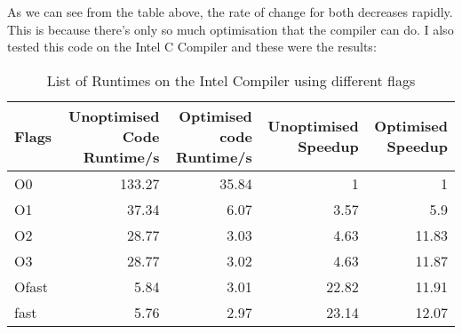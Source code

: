 \documentclass{article}
\begin{document}
    As we can see from the table above, the rate of change for both decreases rapidly. This is because there's only so much optimisation that the compiler can do. I also tested this code on the Intel C Compiler and these were the results:
    \begin{table}[htbp]
      \centering
      \caption{List of Runtimes on the Intel Compiler using different flags}
        \begin{tabular}{|l|r|r|r|r|}
        \hline
        Flags & Unoptimised Code Runtime/s & Optimised code Runtime/s & Unoptimised Speedup & Optimised Speedup \\
        \hline
        O0    & 133.27 & 35.84 & 1     & 1 \\
        \hline
        O1    & 37.34 & 6.07  & 3.57  & 5.9 \\
        \hline
        O2    & 28.77 & 3.03  & 4.63  & 11.83 \\
        \hline
        O3    & 28.77 & 3.02  & 4.63  & 11.87 \\
        \hline
        Ofast & 5.84  & 3.01  & 22.82 & 11.91 \\
        \hline
        fast  & 5.76  & 2.97  & 23.14 & 12.07 \\
        \hline
        \end{tabular}%
      \label{tab:addlabel}%
    \end{table}%
\nocite{*}


\end{document}

